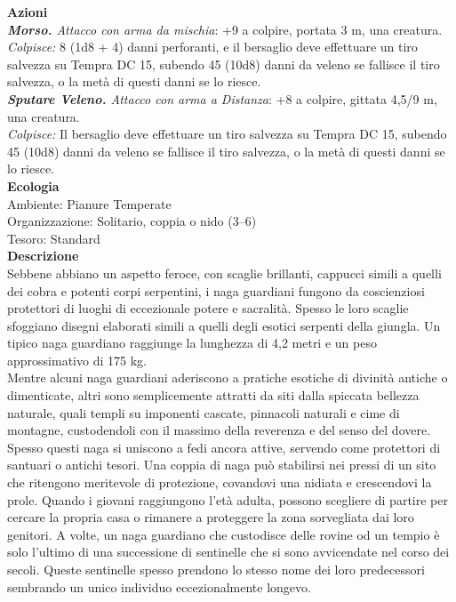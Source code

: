 \begin{multicols}{2}
\smallskip\textbf{Azioni}\\
\emph{\textbf{Morso.} Attacco con arma da mischia}: +9 a colpire, portata 3 m, una creatura.\\
\emph{Colpisce:} 8 (1d8 + 4) danni perforanti, e il bersaglio deve effettuare un tiro salvezza su Tempra DC 15, subendo 45 (10d8) danni da veleno se fallisce il tiro salvezza, o la metà di questi danni se lo riesce.\\
\emph{\textbf{Sputare Veleno.} Attacco con arma a Distanza}: +8 a colpire, gittata 4,5/9 m, una creatura.\\

\emph{Colpisce:} Il bersaglio deve effettuare un tiro salvezza su Tempra DC 15, subendo 45 (10d8) danni da veleno se fallisce il tiro salvezza, o la metà di questi danni se lo riesce.\\
\textbf{Ecologia}\\
Ambiente: Pianure Temperate\\
Organizzazione: Solitario, coppia o nido (3–6)\\
Tesoro: Standard\\
\textbf{Descrizione}\\
Sebbene abbiano un aspetto feroce, con scaglie brillanti, cappucci simili a quelli dei cobra e potenti corpi serpentini, i naga guardiani fungono da coscienziosi protettori di luoghi di eccezionale potere e sacralità. Spesso le loro scaglie sfoggiano disegni elaborati simili a quelli degli esotici serpenti della giungla. Un tipico naga guardiano raggiunge la lunghezza di 4,2 metri e un peso approssimativo di 175 kg.\\
Mentre alcuni naga guardiani aderiscono a pratiche esotiche di divinità antiche o dimenticate, altri sono semplicemente attratti da siti dalla spiccata bellezza naturale, quali templi su imponenti cascate, pinnacoli naturali e cime di montagne, custodendoli con il massimo della reverenza e del senso del dovere. Spesso questi naga si uniscono a fedi ancora attive, servendo come protettori di santuari o antichi tesori. Una coppia di naga può stabilirsi nei pressi di un sito che ritengono meritevole di protezione, covandovi una nidiata e crescendovi la prole. Quando i giovani raggiungono l’età adulta, possono scegliere di partire per cercare la propria casa o rimanere a proteggere la zona sorvegliata dai loro genitori. A volte, un naga guardiano che custodisce delle rovine od un tempio è solo l’ultimo di una successione di sentinelle che si sono avvicendate nel corso dei secoli. Queste sentinelle spesso prendono lo stesso nome dei loro predecessori sembrando un unico individuo eccezionalmente longevo.\\


\end{multicols}
